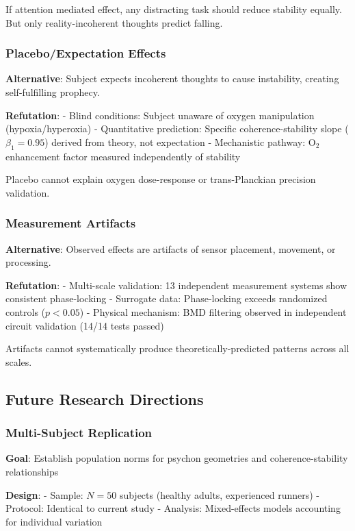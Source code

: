 \documentclass[11pt,onecolumn]{article}
\begin{document}
If attention mediated effect, any distracting task should reduce stability equally. But only reality-incoherent thoughts predict falling.

\subsubsection{Placebo/Expectation Effects}

\textbf{Alternative}: Subject expects incoherent thoughts to cause instability, creating self-fulfilling prophecy.

\textbf{Refutation}:
- Blind conditions: Subject unaware of oxygen manipulation (hypoxia/hyperoxia)
- Quantitative prediction: Specific coherence-stability slope ($\beta_1 = 0.95$) derived from theory, not expectation
- Mechanistic pathway: O$_2$ enhancement factor measured independently of stability

Placebo cannot explain oxygen dose-response or trans-Planckian precision validation.

\subsubsection{Measurement Artifacts}

\textbf{Alternative}: Observed effects are artifacts of sensor placement, movement, or processing.

\textbf{Refutation}:
- Multi-scale validation: 13 independent measurement systems show consistent phase-locking
- Surrogate data: Phase-locking exceeds randomized controls ($p < 0.05$)
- Physical mechanism: BMD filtering observed in independent circuit validation (14/14 tests passed)

Artifacts cannot systematically produce theoretically-predicted patterns across all scales.

\subsection{Future Research Directions}

\subsubsection{Multi-Subject Replication}

\textbf{Goal}: Establish population norms for psychon geometries and coherence-stability relationships

\textbf{Design}:
- Sample: $N = 50$ subjects (healthy adults, experienced runners)
- Protocol: Identical to current study
- Analysis: Mixed-effects models accounting for individual variation
\end{document}

